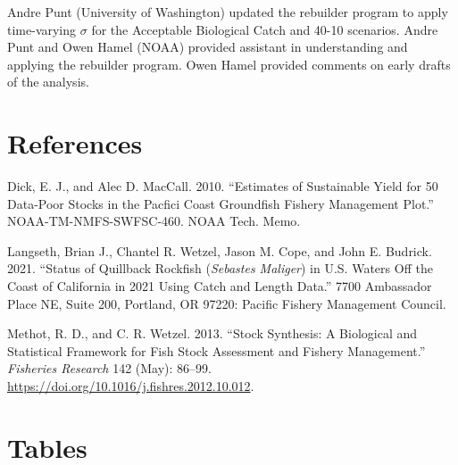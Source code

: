 \documentclass[11pt,
  english,
  a4paper,
]{article}
\begin{document}
\leavevmode\tagmcend\tagstructend


Andre Punt (University of Washington) updated the rebuilder program to apply time-varying {\(\sigma\)\leavevmode\tagmcend\tagstructend} for the Acceptable Biological Catch and 40-10 scenarios. Andre Punt and Owen Hamel (NOAA) provided assistant in understanding and applying the rebuilder program. Owen Hamel provided comments on early drafts of the analysis.

\leavevmode\tagmcend\tagstructend\par

\clearpage


\hypertarget{references}{%
\section{References}\label{references}}

\leavevmode\tagmcend\tagstructend


\hypertarget{refs}{}
\leavevmode\hypertarget{ref-DickandMacCall_dbsra_2010}{}%
Dick, E. J., and Alec D. MacCall. 2010. ``Estimates of Sustainable Yield for 50 Data-Poor Stocks in the Pacfici Coast Groundfish Fishery Management Plot.'' NOAA-TM-NMFS-SWFSC-460. NOAA Tech. Memo.

\leavevmode\hypertarget{ref-Langseth_status_2021}{}%
Langseth, Brian J., Chantel R. Wetzel, Jason M. Cope, and John E. Budrick. 2021. ``Status of Quillback Rockfish (\emph{Sebastes Maliger}) in U.S. Waters Off the Coast of California in 2021 Using Catch and Length Data.'' 7700 Ambassador Place NE, Suite 200, Portland, OR 97220: Pacific Fishery Management Council.

\leavevmode\hypertarget{ref-methot_stock_2013}{}%
Methot, R. D., and C. R. Wetzel. 2013. ``Stock Synthesis: A Biological and Statistical Framework for Fish Stock Assessment and Fishery Management.'' \emph{Fisheries Research} 142 (May): 86--99. \url{https://doi.org/10.1016/j.fishres.2012.10.012}.

\leavevmode\tagmcend\tagstructend

\clearpage


\hypertarget{tables}{%
\section{Tables}\label{tables}}
\end{document}
